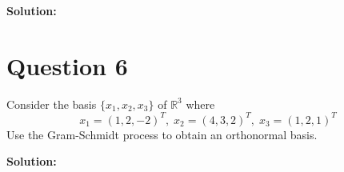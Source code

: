 \documentclass{article}
\begin{document}
\vspace{0.5cm}
\noindent\textbf{Solution:}

\section*{Question 6}
Consider the basis $\{x_1, x_2, x_3\}$ of $\mathbb{R}^3$ where
$$ x_1 = (1, 2, -2)^T, \; x_2 = (4, 3, 2)^T, \; x_3 = (1, 2, 1)^T $$
Use the Gram-Schmidt process to obtain an orthonormal basis.

\vspace{0.5cm}
\noindent\textbf{Solution:}
\end{document}
